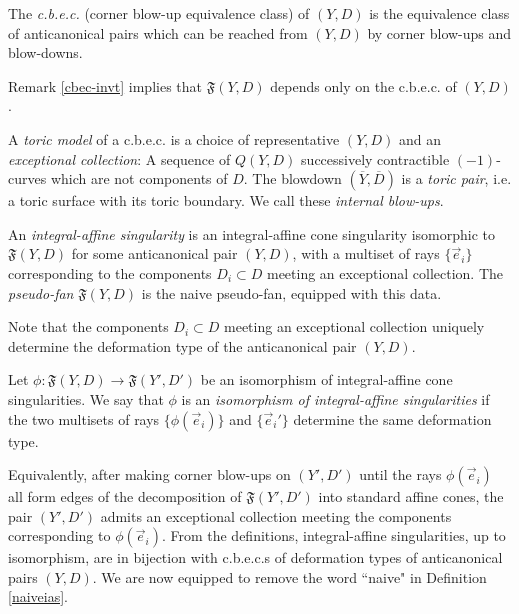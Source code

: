 \documentclass[table,x11names]{amsart}
\begin{document}
\begin{definition} The {\it c.b.e.c.} (corner blow-up equivalence class)
of $(Y,D)$ is the equivalence class of anticanonical pairs which can be
reached from $(Y,D)$ by corner blow-ups and blow-downs. \end{definition}

Remark \ref{cbec-invt} implies that $\mathfrak{F}(Y,D)$ depends only on
the c.b.e.c. of $(Y,D)$. 

\begin{definition} A {\it toric model} of a c.b.e.c. is a choice of
  representative $(Y,D)$ and an {\it exceptional collection}: A sequence
  of  $Q(Y,D)$ successively contractible $(-1)$-curves
  which are not components of $D$.  The blowdown
  $(\overline{Y},\overline{D})$ is a {\it toric pair}, i.e. a toric
  surface with its toric boundary. We call these {\it internal
    blow-ups}.
\end{definition} 

\begin{definition}\label{def:true-sing} An {\it integral-affine singularity}
is an integral-affine cone singularity isomorphic
to $\mathfrak{F}(Y,D)$ for some anticanonical pair $(Y,D)$,
with a multiset of rays $\{\vec{e}_i\}$
corresponding to the components $D_i\subset D$
meeting an exceptional collection. The {\it pseudo-fan}
$\mathfrak{F}(Y,D)$ is the naive pseudo-fan, equipped with this data.
 \end{definition}
 
 Note that the components $D_i\subset D$ meeting an exceptional collection uniquely determine
 the deformation type of the anticanonical pair $(Y,D)$. 
 
 \begin{definition}\label{iso} Let $\phi\colon \mathfrak{F}(Y,D) \rightarrow \mathfrak{F}(Y',D')$
 be an isomorphism of integral-affine cone singularities.
 We say that $\phi$ is an {\it isomorphism of
  integral-affine singularities} if the two multisets of rays
  $\{\phi(\vec{e}_i)\}$ and $\{\vec{e}_i'\}$ determine the same
 deformation type. \end{definition}
 
Equivalently, after making corner blow-ups on $(Y',D')$ until
 the rays $\phi(\vec{e}_i)$ all form edges of the decomposition of $\mathfrak{F}(Y',D')$
 into standard affine cones, the pair $(Y',D')$ admits
 an exceptional collection meeting the components corresponding to $\phi(\vec{e}_i)$. 
From the definitions, integral-affine singularities, up to isomorphism, are in bijection with
c.b.e.c.s of deformation types of anticanonical pairs $(Y,D)$.
We are now equipped to remove the word ``naive" in Definition \ref{naiveias}.
\end{document}
